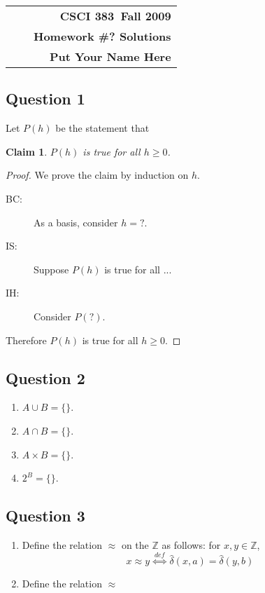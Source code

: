 \documentclass[11pt]{article}
\makeatletter
\newcommand{\course}{CSCI 383}
\newcommand{\semester}{Fall 2009}
\newcommand{\hwk}{Homework \#? Solutions}
\newcommand{\student}{Put Your Name Here}
\newtheorem*{claim}{Claim}
\newcommand{\deltahat}{\hat{\delta}}
\renewcommand\maketitle{
\begin{center}
\begin{tabular*}{6.44in}{l @{\extracolsep{\fill}}c r}
\bfseries  &  & \bfseries \course ~\semester \\
\bfseries&  & \bfseries  \hwk  \\
\bfseries   &   &  \bfseries \student \\ 
\end{tabular*}
\end{center} }
\makeatother
\begin{document}
\maketitle
\thispagestyle{plain}


\noindent 


\subsection*{Question 1}
Let $P(h)$ be the statement that
\begin{claim}
$P(h)$ is true for all $h \geq 0$.
\end{claim}

\begin{proof}
We prove the claim by induction on $h$.
\begin{description}
\item[BC:] As a basis, consider $h=?$.
\item[IS:] Suppose $P(h)$ is true for all ...
\item[IH:] Consider $P(?)$.
\end{description}
Therefore $P(h)$ is true for all $h \geq 0$.
\end{proof}



\subsection*{Question 2}

\begin{enumerate}
\item $A \cup B = \{ \}$.
\item $A \cap B = \{ \}$.
\item $A \times B = \{ \}$.
\item $2^B = \{ \}$.
\end{enumerate}


\subsection*{Question 3}

\begin{enumerate}
\item Define the relation $\approx$ on the $\mathbb{Z}$ as follows: for $x, y \in \mathbb{Z}$, 
\[ x \approx y ~\stackrel{def}{\iff}~ \deltahat(x,a)=\deltahat(y,b)\]
\item Define the relation $\approx$
\end{enumerate}
\end{document}
